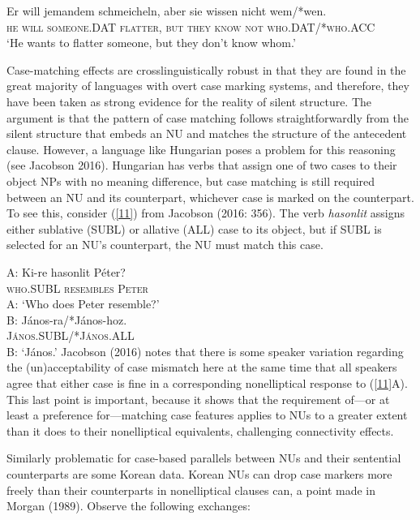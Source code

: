 \documentclass[output=paper]{langsci/langscibook}
\begin{document}
{\ea
\gll Er will jemandem schmeicheln, aber sie wissen nicht wem/*wen.\\
\textsc{he} \textsc{will} \textsc{someone.DAT} \textsc{flatter}, \textsc{but} \textsc{they} \textsc{know} \textsc{not} \textsc{who.DAT/*who.ACC}\\
\glt `He wants to flatter someone, but they don't know whom.'\label{10}\z

Case-matching effects are crosslinguistically robust in that they are found in the great majority of languages with overt case marking systems, and therefore, they have been taken as strong evidence for the reality of silent structure. The argument is that the pattern of case matching follows straightforwardly from the silent structure that embeds an NU and matches the structure of the antecedent clause. However, a language like Hungarian poses a problem for this reasoning (see Jacobson 2016). Hungarian has verbs that assign one of two cases to their object NPs with no meaning difference, but case matching is still required between an NU and its counterpart, whichever case is marked on the counterpart. To see this, consider (\ref{11}) from Jacobson (2016: 356). The verb {\it hasonlit} assigns either sublative (SUBL) or allative (ALL) case to its object, but if SUBL is selected for an NU's counterpart, the NU must match this case.

\ea
A: \gll Ki-re hasonlit P\'{e}ter?\\
 \textsc{who.SUBL} \textsc{resembles} \textsc{Peter}\\
 \glt A: `Who does Peter resemble?'\\

B: \gll J\'{a}nos-ra/*J\'{a}nos-hoz.\\
\textsc{J\'{a}nos.SUBL/*J\'{a}nos.ALL}\\
\glt B: `J\'{a}nos.'\label{11}\z
Jacobson (2016) notes that there is some speaker variation regarding the (un)ac\-cepta\-bi\-li\-ty of case mismatch here at the same time that all speakers agree that either case is fine in a corresponding nonelliptical response to (\ref{11}A). This last point is important, because it shows that the requirement of---or at least a preference for---matching case features applies to NUs to a greater extent than it does to their nonelliptical equivalents, challenging connectivity effects.

Similarly problematic for case-based parallels between NUs and their sentential counterparts are some Korean data. Korean NUs can drop case markers more freely than their counterparts in nonelliptical clauses can, a point made in Morgan (1989). Observe the following exchanges:

}
\end{document}
